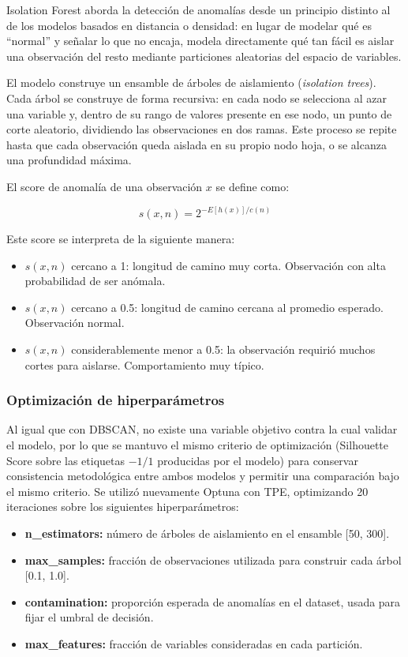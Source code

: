 \documentclass[11pt]{article}
\begin{document}
Isolation Forest aborda la detección de anomalías desde un principio distinto al de los modelos basados
en distancia o densidad: en lugar de modelar qué es ``normal'' y señalar lo que no encaja, modela
directamente qué tan fácil es aislar una observación del resto mediante particiones aleatorias del espacio
de variables.

El modelo construye un ensamble de árboles de aislamiento (\textit{isolation trees}). Cada árbol se construye de
forma recursiva: en cada nodo se selecciona al azar una variable y, dentro de su rango de valores presente
en ese nodo, un punto de corte aleatorio, dividiendo las observaciones en dos ramas. Este proceso se
repite hasta que cada observación queda aislada en su propio nodo hoja, o se alcanza una profundidad
máxima.

El score de anomalía de una observación $x$ se define como:

\begin{equation}
s(x, n) = 2^{-E[h(x)] / c(n)}
\end{equation}

Este score se interpreta de la siguiente manera:

\begin{itemize}
    \item $s(x,n)$ cercano a 1: longitud de camino muy corta. Observación con alta probabilidad de ser anómala.
    \item $s(x,n)$ cercano a 0.5: longitud de camino cercana al promedio esperado. Observación normal.
    \item $s(x,n)$ considerablemente menor a 0.5: la observación requirió muchos cortes para aislarse. Comportamiento muy típico.
\end{itemize}

\subsubsection*{Optimización de hiperparámetros}

Al igual que con DBSCAN, no existe una variable objetivo contra la cual validar el modelo, por lo que se
mantuvo el mismo criterio de optimización (Silhouette Score sobre las etiquetas $-1/1$ producidas por el
modelo) para conservar consistencia metodológica entre ambos modelos y permitir una comparación
bajo el mismo criterio. Se utilizó nuevamente Optuna con TPE, optimizando 20 iteraciones sobre los
siguientes hiperparámetros:

\begin{itemize}
    \item \textbf{n\_estimators:} número de árboles de aislamiento en el ensamble [50, 300].
    \item \textbf{max\_samples:} fracción de observaciones utilizada para construir cada árbol [0.1, 1.0].
    \item \textbf{contamination:} proporción esperada de anomalías en el dataset, usada para fijar el umbral de decisión.
    \item \textbf{max\_features:} fracción de variables consideradas en cada partición.
\end{itemize}
\end{document}
